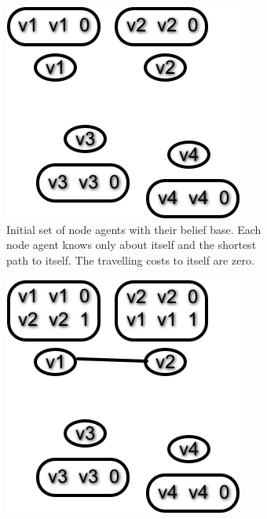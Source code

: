 \begin{figure}
  \centering
  \caption{Executing the Distance-Vector Routing Protocol algorithm as described in \autoref{alg:map_dv} on a small network of four nodes. Each node has a table attached, containing all accessible nodes. The first parameter is the destination node, the second one is the node to pass through and the third parameter shows the overall distance to the destination.       \label{fig:dv}}
    \begin{subfigure}{.45\textwidth}
        \includegraphics[width=\textwidth] {images/dv0.png}
        \caption{Initial set of node agents with their belief base. Each node agent knows only about itself and the shortest path to itself. The travelling costs to itself are zero.}
    \end{subfigure}\quad
    \begin{subfigure}{.45\textwidth}
        \includegraphics[width=\textwidth] {images/dv1.png}

\end{subfigure}
\end{figure}
